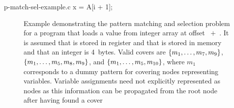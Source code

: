 \begin{filecontents*}{p-match-sel-example.c}
x = A[i + 1];
\end{filecontents*}

\begin{figure}
  \centering%
                {}%
  \hfill%
  \hfill%

  \caption[Example of the pattern matching and selection problem]%
          {%
            Example demonstrating the pattern matching and selection problem for
            a program that loads a value from integer array  at offset
            \mbox{ $+$ }.
            It is assumed that  is
            stored in register and that  is stored in memory and that
            an integer is 4~bytes.
            Valid covers are \mbox{$\mSet{m_1, \ldots, m_7, m_9}$},
            \mbox{$\mSet{m_1, \ldots, m_5, m_8, m_9}$}, and
            \mbox{$\mSet{m_1, \ldots, m_5, m_{10}}$}, where $m_1$ corresponds to
            a dummy pattern for covering nodes representing variables.
            Variable assignments need not explicitly represented as nodes as
            this information can be propagated from the root node after having
            found a cover%
          }
\end{figure}

